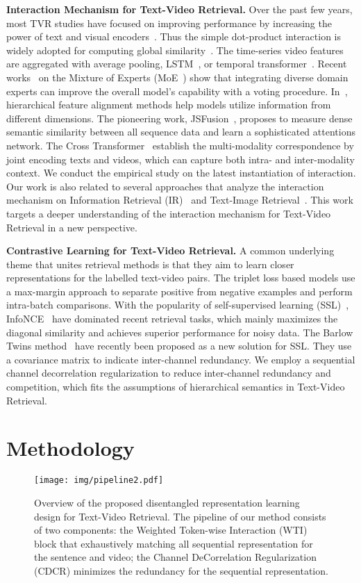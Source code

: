 \documentclass[runningheads]{llncs}
\begin{document}
\noindent\textbf{Interaction Mechanism for Text-Video Retrieval.}
Over the past few years, most TVR studies have focused on improving performance by increasing the power of text and visual encoders~\cite{teachtext,mmt,hit,ce}. 
Thus the simple dot-product interaction is widely adopted for computing global similarity~\cite{clip4clip}. 
The time-series video features are aggregated with average pooling, LSTM~\cite{lstm}, or temporal transformer~\cite{clip4clip}.
Recent works~\cite{teachtext,mmt,ce} on the Mixture of Experts (MoE~\cite{moe}) show that integrating diverse domain experts can improve the overall model's capability with a voting procedure.
In~\cite{hit}, hierarchical feature alignment methods help models utilize information from different dimensions.
The pioneering work, JSFusion~\cite{jsfusion}, proposes to measure dense semantic similarity between all sequence data and learn a sophisticated attentions network. 
The Cross Transformer~\cite{hero,univl,clip4clip} establish the multi-modality correspondence by joint encoding texts and videos, which can capture both intra- and inter-modality context. 
We conduct the empirical study on the latest instantiation of interaction.
Our work is also related to several approaches that analyze the interaction mechanism on Information Retrieval (IR)~\cite{colbert} and Text-Image Retrieval~\cite{vilt}.
This work targets a deeper understanding of the interaction mechanism for Text-Video Retrieval in a new perspective.


\noindent\textbf{Contrastive Learning for Text-Video Retrieval.}
A common underlying theme that unites retrieval methods is that they aim to learn closer representations for the labelled text-video pairs.
The triplet loss based models\cite{support,ce} use a max-margin approach to separate positive from negative examples and perform intra-batch comparisons.
With the popularity of self-supervised learning (SSL)~\cite{ssl1,ssl2,infonce}, InfoNCE~\cite{infonce} have dominated recent retrieval tasks, which mainly maximizes the diagonal similarity and achieves superior performance for noisy data.
The Barlow Twins method~\cite{barlow} have recently been proposed as a new solution for SSL. 
They use a covariance matrix to indicate inter-channel redundancy.
We employ a sequential channel decorrelation regularization to reduce inter-channel redundancy and competition, which fits the assumptions of hierarchical semantics in Text-Video Retrieval.
 
\section{Methodology}
\label{sec:method}
\begin{figure}[t]
\centering
\texttt{[image: img/pipeline2.pdf]}
\caption{Overview of the proposed disentangled representation learning design for Text-Video Retrieval. 
The pipeline of our method consists of two components: the Weighted Token-wise Interaction (WTI) block that exhaustively matching all sequential representation for the sentence and video; the Channel DeCorrelation Regularization (CDCR) minimizes the redundancy for the sequential representation.}
\label{fig:pipeline}
\end{figure}
\end{document}

